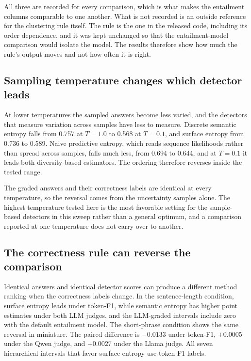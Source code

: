 All three are recorded for every comparison, which is what makes the
entailment columns comparable to one another. What is not recorded is an
outside reference for the clustering rule itself. The rule is the one in the
released code, including its order dependence, and it was kept unchanged so
that the entailment-model comparison would isolate the model. The results
therefore show how much the rule's output moves and not how often it is right.

\subsection{Sampling temperature changes which detector leads}
\label{sec:diversity-vs-likelihood}

At lower temperatures the sampled answers become less varied, and the detectors
that measure variation across samples have less to measure. Discrete semantic
entropy falls from 0.757 at $T=1.0$ to 0.568 at $T=0.1$, and surface entropy
from 0.736 to 0.589. Naive predictive entropy, which reads sequence likelihoods
rather than spread across samples, falls much less, from 0.694 to 0.644, and at
$T=0.1$ it leads both diversity-based estimators. The ordering therefore
reverses inside the tested range.

The graded answers and their correctness
labels are identical at every temperature, so the reversal comes from the
uncertainty samples alone. The highest temperature tested here is the most
favorable setting for the sample-based detectors in this sweep rather than a
general optimum, and a comparison reported at one temperature does not carry
over to another.

\subsection{The correctness rule can reverse the comparison}

Identical answers and identical detector scores can produce a different method
ranking when the correctness labels change. In the sentence-length condition,
surface entropy leads under token-F1, while semantic entropy has higher point
estimates under both LLM judges, and the LLM-graded intervals include zero with
the default entailment model. The short-phrase condition shows the same
reversal in miniature. The paired difference is $-0.0133$ under token-F1,
$+0.0005$ under the Qwen judge, and $+0.0027$ under the Llama judge. All seven
hierarchical intervals that favor surface entropy use token-F1 labels.

